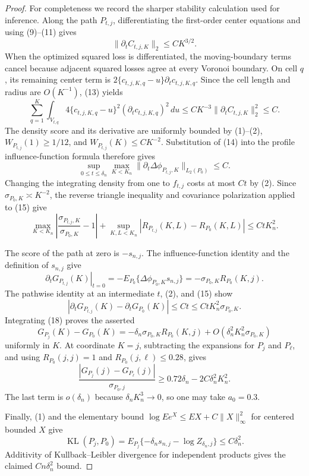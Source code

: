 \documentclass{article}
\begin{document}
\begin{proof}
For completeness we record the sharper stability calculation used for inference.  Along the path \(P_{t,j}\), differentiating the first-order center equations and using (9)--(11) gives
\[
 \|\partial_tC_{t,j,K}\|_2\leq CK^{3/2}.                                      \tag{13}
\]
When the optimized squared loss is differentiated, the moving-boundary terms cancel because adjacent squared losses agree at every Voronoi boundary.  On cell \(q\), its remaining center term is \(2\{c_{t,j,K,q}-u\}\partial_tc_{t,j,K,q}\).  Since the cell length and radius are \(O(K^{-1})\), (13) yields
\[
 \sum_{q=1}^K\int_{V_{t,q}}
 4\{c_{t,j,K,q}-u\}^2(\partial_tc_{t,j,K,q})^2\,du
 \leq CK^{-3}\|\partial_tC_{t,j,K}\|_2^2\leq C.                               \tag{14}
\]
The density score and its derivative are uniformly bounded by (1)--(2), \(W_{P_{t,j}}(1)\geq1/12\), and \(W_{P_{t,j}}(K)\leq CK^{-2}\).  Substitution of (14) into the profile influence-function formula therefore gives
\[
 \sup_{0\leq t\leq\delta_n}\max_{K<K_n}
 \|\partial_t\Delta\phi_{P_{t,j},K}\|_{L_2(P_0)}\leq C.                       \tag{15}
\]
Changing the integrating density from one to \(f_{t,j}\) costs at most \(Ct\) by (2).  Since \(\sigma_{P_0,K}\asymp K^{-2}\), the reverse triangle inequality and covariance polarization applied to (15) give
\[
 \max_{K<K_n}\left|\frac{\sigma_{P_{t,j},K}}{\sigma_{P_0,K}}-1\right|
 +\sup_{K,L<K_n}|R_{P_{t,j}}(K,L)-R_{P_0}(K,L)|
 \leq CtK_n^2.                                                               \tag{16}
\]

The score of the path at zero is \(-s_{n,j}\).  The influence-function identity and the definition of \(s_{n,j}\) give
\[
 \left.\partial_tG_{P_{t,j}}(K)\right|_{t=0}
 =-E_{P_0}\{\Delta\phi_{P_0,K}s_{n,j}\}
 =-\sigma_{P_0,K}R_{P_0}(K,j).                                                \tag{17}
\]
The pathwise identity at an intermediate \(t\), (2), and (15) show
\[
 |\partial_tG_{P_{t,j}}(K)-\partial_tG_{P_0}(K)|\leq Ct
 \leq CtK_n^2\sigma_{P_0,K}.                                                 \tag{18}
\]
Integrating (18) proves the asserted
\[
 G_{P_j}(K)-G_{P_0}(K)
 =-\delta_n\sigma_{P_0,K}R_{P_0}(K,j)
 +O(\delta_n^2K_n^2\sigma_{P_0,K})                                           \tag{19}
\]
uniformly in \(K\).  At coordinate \(K=j\), subtracting the expansions for \(P_j\) and \(P_\ell\), and using \(R_{P_0}(j,j)=1\) and \(R_{P_0}(j,\ell)\leq0.28\), gives
\[
 \frac{|G_{P_j}(j)-G_{P_\ell}(j)|}{\sigma_{P_0,j}}
 \geq0.72\delta_n-2C\delta_n^2K_n^2.                                         \tag{20}
\]
The last term is \(o(\delta_n)\) because \(\delta_nK_n^3\to0\), so one may take \(a_0=0.3\).

Finally, (1) and the elementary bound \(\log E e^{X}\leq E X+C\|X\|_\infty^2\) for centered bounded \(X\) give
\[
 \operatorname{KL}(P_j,P_0)
 =E_{P_j}\{-\delta_ns_{n,j}-\log Z_{\delta_n,j}\}
 \leq C\delta_n^2.
\]
Additivity of Kullback--Leibler divergence for independent products gives the claimed \(Cn\delta_n^2\) bound.
\end{proof}
\end{document}

